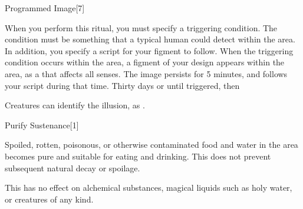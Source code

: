 \begin{spellsection}{Programmed Image}[7]
    \begin{spellheader}
    \end{spellheader}
    \begin{spellcontent}
        \begin{spelltargetinginfo}
        \end{spelltargetinginfo}
        \begin{spelleffects}
            \spellspecial When you perform this ritual, you must specify a triggering condition. The condition must be something that a typical human could detect within the area. In addition, you specify a script for your figment to follow.
            \spelleffect When the triggering condition occurs within the area, a figment of your design appears within the area, as a  that affects all senses. The image persists for 5 minutes, and follows your script during that time.
            \spelldur Thirty days or until triggered, then \durmed
        \end{spelleffects}
    \end{spellcontent}
    \begin{spellfooter}
        \spellnotes Creatures can identify the illusion, as .
    \end{spellfooter}
\end{spellsection}

\begin{spellsection}{Purify Sustenance}[1]
    \begin{spellheader}
    \end{spellheader}
    \begin{spellcontent}
        \begin{spelltargetinginfo}
        \end{spelltargetinginfo}
        \begin{spelleffects}
            \spelleffect Spoiled, rotten, poisonous, or otherwise contaminated food and water in the area becomes pure and suitable for eating and drinking. This does not prevent subsequent natural decay or spoilage.
        \end{spelleffects}
    \end{spellcontent}
    \begin{spellfooter}
        \spellnotes This has no effect on alchemical substances, magical liquids such as holy water, or creatures of any kind.
    \end{spellfooter}
\end{spellsection}


